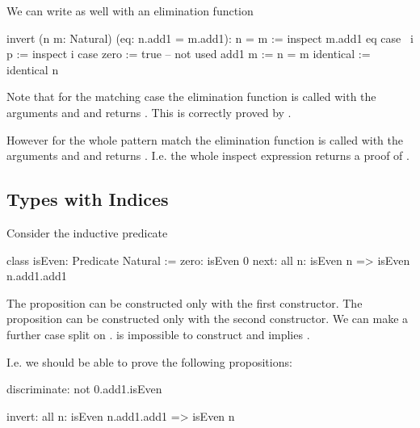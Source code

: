 We can write  as well with an elimination function

\begin{alba}
    invert (n m: Natural) (eq: n.add1 = m.add1): n = m :=
        inspect
            m.add1
            eq
        case
            {\ i p :=
                inspect i case
                    zero :=
                        true -- not used
                    add1 m :=
                        n = m}
            identical :=
                identical n
\end{alba}

Note that for the matching case the elimination function is called with the
arguments  and  and returns .  This is
correctly proved by .

However for the whole pattern match the elimination function is called with the
arguments  and  and returns . I.e. the
whole inspect expression returns a proof of .







\subsection{Types with Indices}

Consider the inductive predicate

\begin{alba}
    class
        isEven: Predicate Natural
    :=
        zero: isEven 0
        next: all n: isEven n => isEven n.add1.add1
\end{alba}

The proposition  can be constructed only with the first
constructor. The proposition  can be
constructed only with the second constructor. We can make a further case split
on .   is impossible to construct and
 implies .

I.e. we should be able to prove the following propositions:

\begin{alba}
    discriminate: not 0.add1.isEven

    invert: all n: isEven n.add1.add1 => isEven n
\end{alba}


